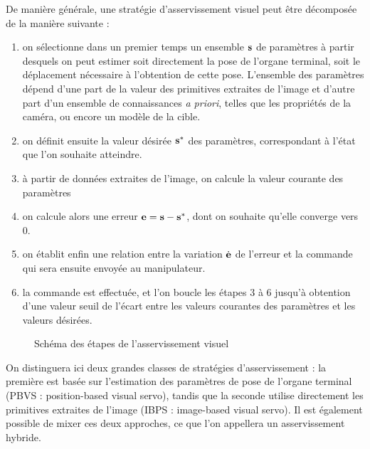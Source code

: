 De manière générale, une stratégie d'asservissement visuel peut être décomposée 
de la manière suivante :
\begin{enumerate}
 \item on sélectionne dans un premier temps un ensemble ${\bf s}$ de paramètres 
à partir desquels on peut estimer soit directement la pose de l'organe 
terminal, 
soit le déplacement nécessaire à l'obtention de cette pose. L'ensemble des 
paramètres dépend d'une part de la valeur des primitives extraites de l'image 
et 
d'autre part d'un ensemble de connaissances {\it a priori}, telles que les 
propriétés de la caméra, ou encore un modèle de la cible.
 \item on définit ensuite la valeur désirée ${\bf s}^*$ des paramètres, 
correspondant à l'état que l'on souhaite atteindre.
 \item à partir de données extraites de l'image, on calcule la valeur courante 
des paramètres
 \item on calcule alors une erreur ${\bf e} = {\bf s} - {\bf s}^*$, dont on 
souhaite qu'elle converge vers $0$.
 \item on établit enfin une relation entre la variation $\dot {\bf e}$ de 
l'erreur et la commande qui sera ensuite envoyée au manipulateur.
 \item la commande est effectuée, et l'on boucle les étapes $3$ à $6$ jusqu'à 
obtention d'une valeur seuil de l'écart entre les valeurs courantes des 
paramètres et les valeurs désirées.
\end{enumerate}

\begin{figure}[htp]
  \centering
    \def\svgwidth{.95\linewidth}
  
    \caption{\footnotesize{Schéma des étapes de l'asservissement visuel}}
\label{intro:fig13b}
\end{figure}

On distinguera ici deux grandes classes de stratégies d'asservissement : la 
première est basée sur l'estimation des paramètres de pose de l'organe terminal 
(PBVS : position-based visual servo), tandis que la seconde utilise directement 
les primitives extraites de l'image (IBPS : image-based visual servo). Il est 
également possible de mixer ces deux approches, ce que l'on appellera un 
asservissement hybride.

